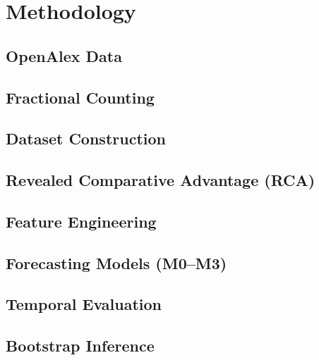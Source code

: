 \chapter{Methodology} \label{chap:method}

\section{OpenAlex Data}

\section{Fractional Counting}

\section{Dataset Construction}

\section{Revealed Comparative Advantage (RCA)}

\section{Feature Engineering}

\section{Forecasting Models (M0--M3)}

\section{Temporal Evaluation}

\section{Bootstrap Inference}
